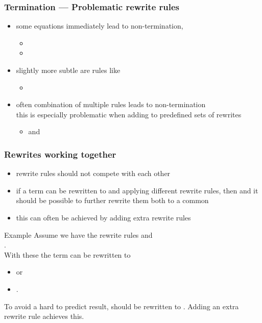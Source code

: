 \begin{frame}
\frametitle{Termination --- Problematic rewrite rules}

\begin{itemize}
\item some equations immediately lead to non-termination, \eg
\begin{itemize}
\item {}
\item {}
\end{itemize}\medskip
\item slightly more subtle are rules like
\begin{itemize}
\item {}
\end{itemize}\medskip
\item often combination of multiple rules leads to non-termination\\
 this is especially problematic when adding to predefined sets of rewrites 
\begin{itemize}
\item {} and \\
\end{itemize}\medskip
\end{itemize}
\end{frame}


\begin{frame}
\frametitle{Rewrites working together}

\begin{itemize}
\item rewrite rules should not compete with each other
\item if a term  can be rewritten to  and  applying different rewrite rules, then  and  it should be possible to further rewrite them both to a common 
\item this can often be achieved by adding extra rewrite rules
\end{itemize}

\begin{exampleblock}{Example}
Assume we have the rewrite rules  and\\
.\\
With these the term  can be rewritten to 
\begin{itemize}
\item {} or 
\item {}.
\end{itemize}
To avoid a hard to predict result,  should be rewritten to . Adding an extra rewrite rule  achieves this.
\end{exampleblock}

\end{frame}


